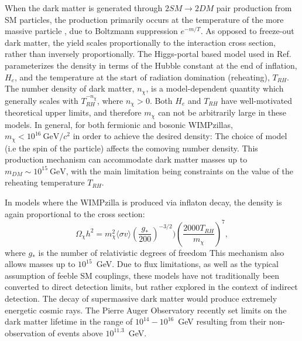 When the dark matter is generated through $2SM\rightarrow2DM$ pair production from SM particles, the production primarily occurs at the temperature of the more massive particle \cite{hambye_direct_2018}, due to Boltzmann suppression $e^{-m/T}$.
As opposed to freeze-out dark matter, the yield scales proportionally to the interaction cross section, rather than inversely proportionally. 
The Higgs-portal based model used in Ref. \cite{kolb_superheavy_2017} parameterizes the density in terms of the Hubble constant at the end of inflation, $H_e$, and the temperature at the start of radiation domination (reheating), $T_{RH}$.
The number density of dark matter, $n_\chi$, is a model-dependent quantity which generally scales with  $T_{RH}^{-n_\chi}$, where $n_\chi>0$.
Both $H_e$ and $T_{RH}$ have well-motivated theoretical upper limits, and therefore $m_\chi$ can not be arbitrarily large in these models. 
In general, for both fermionic and bosonic WIMPzillas, $m_\chi< 10^{16} \mathrm{~GeV}/c^2$ in order to achieve the desired density\cite{kolb_superheavy_2017}:
The choice of model (i.e the spin of the particle) affects the comoving number density.
This production mechanism can accommodate dark matter masses up to $m_{DM}\sim 10^{15} \mathrm{~GeV}$, with the main limitation being constraints on the value of the reheating temperature $T_{RH}$.

In models where the WIMPzilla is produced via inflaton decay, the density is again proportional to the cross section\cite{kolb_wimpzillas_1998}:
\begin{equation}
    \Omega_\chi h^2 = m_\chi ^2 \langle \sigma v \rangle  (\frac{g_*}{200})^{-3/2})(\frac{2000 T_{RH}}{m_\chi})^7,
\end{equation}
\noindent
 where $g_*$ is the number of relativistic degrees of freedom
This mechanism also allows masses up to $10^{15}$~GeV.
Due to flux limitations, as well as the typical assumption of feeble SM couplings, these models have not traditionally been converted to direct detection limits, but rather explored in the context of indirect detection.
The decay of supermassive dark matter would produce extremely energetic cosmic rays. 
The Pierre Auger Observatory recently set limits on the dark matter lifetime in the range of $10^{14}-10^{16}$~GeV resulting from their non-observation of events above $10^{11.3}$~GeV\cite{alcantara_hunting_2019}.

